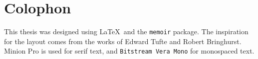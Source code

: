 \pagestyle{empty}
\hfill
\vfill
\section*{Colophon}
This thesis was designed using \LaTeX\ and the \texttt{memoir} package. The inspiration for the layout comes from the works of Edward Tufte and Robert Bringhurst. Minion Pro is used for serif text, and \texttt{Bitstream Vera Mono} for monospaced text.
